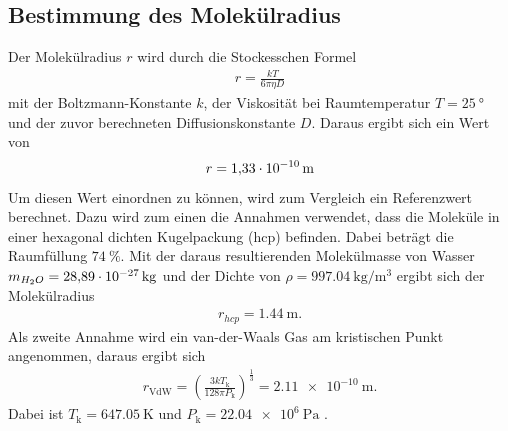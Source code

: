 \subsection{Bestimmung des Molekülradius}
Der Molekülradius $r$ wird durch die Stockesschen Formel
\begin{align*}
  r = \frac{kT}{6\pi\eta D}
\end{align*}
mit der Boltzmann-Konstante $k$, der Viskosität bei Raumtemperatur $T = \SI{25}{\degree}$
und der zuvor berechneten Diffusionskonstante $D$. Daraus ergibt sich ein Wert von
\begin{align*}
  r = \SI{1.33d-10}{\meter}
\end{align*}
Um diesen Wert einordnen zu können, wird zum Vergleich ein Referenzwert berechnet.
Dazu wird zum einen die Annahmen verwendet, dass die Moleküle in einer
hexagonal dichten Kugelpackung (hcp) befinden. Dabei beträgt die Raumfüllung
$\SI{74}{\percent}$. Mit der daraus resultierenden Molekülmasse von Wasser
$m_{H_2O} = \SI{28.89d-27}{\kilo\gram}$ und der Dichte von
$\rho = \SI{997.04}{\kilo\gram\per\cubic\meter}$ \cite{hcp} ergibt sich der
Molekülradius
\begin{align*}
  r_{hcp} = \SI{1.44}{\meter}.
\end{align*}
Als zweite Annahme wird ein van-der-Waals Gas am kristischen Punkt angenommen,
daraus ergibt sich
\begin{align*}
  r_\text{VdW} = \left(\frac{3kT_\text{k}}{128\pi P_\text{k}}\right)^\frac{1}{3} = \SI{2.11e-10}{\meter}.
\end{align*}
Dabei ist $T_\text{k} = \SI{647.05}{\kelvin}$ und $P_\text{k} = \SI{22.04e6}{\pascal}$ \cite{VdW}.




